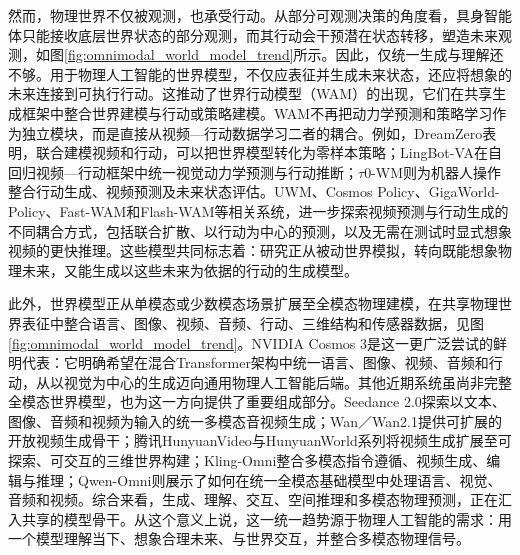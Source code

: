 然而，物理世界不仅被观测，也承受行动。从部分可观测决策的角度看，具身智能体只能接收底层世界状态的部分观测，而其行动会干预潜在状态转移，塑造未来观测，如图\ref{fig:omnimodal_world_model_trend}所示。因此，仅统一生成与理解还不够。用于物理人工智能的世界模型，不仅应表征并生成未来状态，还应将想象的未来连接到可执行行动。这推动了世界行动模型（WAM）的出现\citep{wang2026wam_survey}，它们在共享生成框架中整合世界建模与行动或策略建模。WAM不再把动力学预测和策略学习作为独立模块，而是直接从视频—行动数据学习二者的耦合。例如，DreamZero\citep{ye2026dreamzero}表明，联合建模视频和行动，可以把世界模型转化为零样本策略；LingBot-VA\citep{li2026lingbotva}在自回归视频—行动框架中统一视觉动力学预测与行动推断；$\tau$0-WM\citep{zhou2026tau0wm}则为机器人操作整合行动生成、视频预测及未来状态评估。UWM\citep{zhu2025uwm}、Cosmos Policy\citep{kim2026cosmospolicy}、GigaWorld-Policy\citep{ye2026gigaworldpolicy}、Fast-WAM\citep{yuan2026fastwam}和Flash-WAM\citep{akbari2026flashwam}等相关系统，进一步探索视频预测与行动生成的不同耦合方式，包括联合扩散、以行动为中心的预测，以及无需在测试时显式想象视频的更快推理。这些模型共同标志着：研究正从被动世界模拟，转向既能想象物理未来，又能生成以这些未来为依据的行动的生成模型。

此外，世界模型正从单模态或少数模态场景扩展至全模态物理建模，在共享物理世界表征中整合语言、图像、视频、音频、行动、三维结构和传感器数据，见图\ref{fig:omnimodal_world_model_trend}。NVIDIA Cosmos 3\citep{nvidia2026cosmos3}是这一更广泛尝试的鲜明代表：它明确希望在混合Transformer架构中统一语言、图像、视频、音频和行动，从以视觉为中心的生成迈向通用物理人工智能后端。其他近期系统虽尚非完整全模态世界模型，也为这一方向提供了重要组成部分。Seedance 2.0\citep{seedance2026seedance2}探索以文本、图像、音频和视频为输入的统一多模态音视频生成；Wan／Wan2.1\citep{wan2025wan}提供可扩展的开放视频生成骨干；腾讯HunyuanVideo与HunyuanWorld系列\citep{kong2024hunyuanvideo,hunyuanworld2025}将视频生成扩展至可探索、可交互的三维世界构建；Kling-Omni\citep{kling2025omni}整合多模态指令遵循、视频生成、编辑与推理；Qwen-Omni\citep{qwen2025omni}则展示了如何在统一全模态基础模型中处理语言、视觉、音频和视频。综合来看，生成、理解、交互、空间推理和多模态物理预测，正在汇入共享的模型骨干。从这个意义上说，这一统一趋势源于物理人工智能的需求：用一个模型理解当下、想象合理未来、与世界交互，并整合多模态物理信号。
